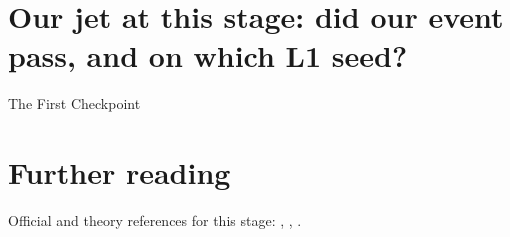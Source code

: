 \section{Our jet at this stage: did our event pass, and on which L1 seed?}
\label{sec:first_checkpoint:our_jet_at_this_stage_did_our_event_pass}

\begin{ledger}{The First Checkpoint}
\end{ledger}

\section{Further reading}
\label{sec:first_checkpoint:further_reading}
Official and theory references for this stage: \cite{CMS:2020cmk}, \cite{CMS:2016ngn}, \cite{CMS:2020jkc}.

\begin{pitfalls}
\end{pitfalls}

\begin{exercises}
\item {}
\item {}
\end{exercises}
